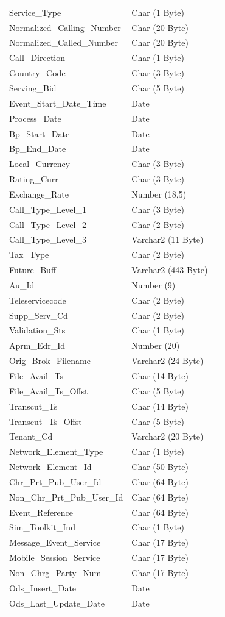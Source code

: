 \documentclass[12pt,twoside]{article}
\begin{document}
\begin{longtable}{l|l|l}
Service\_Type & Char (1 Byte) & \\
Normalized\_Calling\_Number & Char (20 Byte) & \\
Normalized\_Called\_Number & Char (20 Byte) & \\
Call\_Direction & Char (1 Byte) & \\
Country\_Code & Char (3 Byte) & \\
Serving\_Bid & Char (5 Byte) & \\
Event\_Start\_Date\_Time & Date & \\
Process\_Date & Date & \\
Bp\_Start\_Date & Date & \\
Bp\_End\_Date & Date & \\
Local\_Currency & Char (3 Byte) & \\
Rating\_Curr & Char (3 Byte) & \\
Exchange\_Rate & Number (18,5) & \\
Call\_Type\_Level\_1 & Char (3 Byte) & \\
Call\_Type\_Level\_2 & Char (2 Byte) & \\
Call\_Type\_Level\_3 & Varchar2 (11 Byte) & \\
Tax\_Type & Char (2 Byte) & \\
Future\_Buff & Varchar2 (443 Byte) & \\
Au\_Id & Number (9) & \\
Teleservicecode & Char (2 Byte) & \\
Supp\_Serv\_Cd & Char (2 Byte) & \\
Validation\_Sts & Char (1 Byte) & \\
Aprm\_Edr\_Id & Number (20) & \\
Orig\_Brok\_Filename & Varchar2 (24 Byte) & \\
File\_Avail\_Ts & Char (14 Byte) & \\
File\_Avail\_Ts\_Offst & Char (5 Byte) & \\
Transcut\_Ts & Char (14 Byte) & \\
Transcut\_Ts\_Offst & Char (5 Byte) & \\
Tenant\_Cd & Varchar2 (20 Byte) & \\
Network\_Element\_Type & Char (1 Byte) & \\
Network\_Element\_Id & Char (50 Byte) & \\
Chr\_Prt\_Pub\_User\_Id & Char (64 Byte) & \\
Non\_Chr\_Prt\_Pub\_User\_Id & Char (64 Byte) & \\
Event\_Reference & Char (64 Byte) & \\
Sim\_Toolkit\_Ind & Char (1 Byte) & \\
Message\_Event\_Service & Char (17 Byte) & \\
Mobile\_Session\_Service & Char (17 Byte) & \\
Non\_Chrg\_Party\_Num & Char (17 Byte) & \\
Ods\_Insert\_Date & Date & \\
Ods\_Last\_Update\_Date & Date & \\
\hline
\end{longtable}
\normalsize
\end{document}
